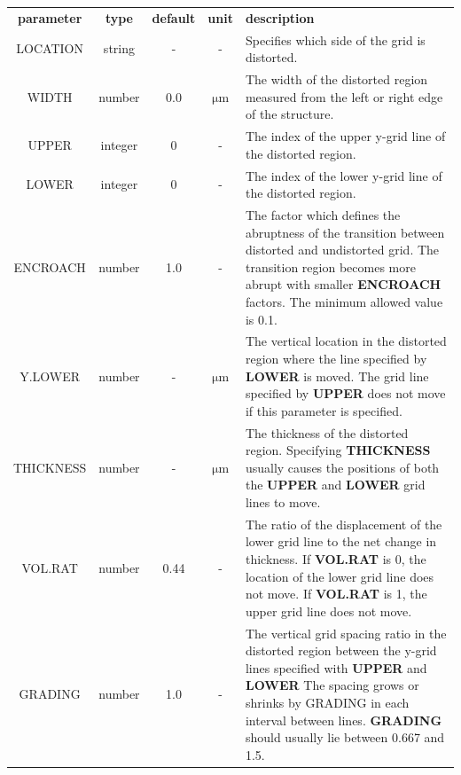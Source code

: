 \documentclass[11pt,pdftex]{article}
\begin{document}
\small
\noindent\begin{longtable}{ccccp{7cm}}
\textbf{parameter}   & \textbf{type}  & \textbf{default} & \textbf{unit} & \textbf{description} \\
LOCATION    & string  & -       & -                    & Specifies which side of the grid is distorted. \\
WIDTH       & number  & 0.0     & $\mathrm{\mu m}$     & The width of the distorted region measured from the left or
                                                         right edge of the structure. \\
UPPER       & integer & 0       & -                    & The index of the upper y-grid line of the distorted region. \\
LOWER       & integer & 0       & -                    & The index of the lower y-grid line of the distorted region. \\
ENCROACH    & number  & 1.0     & -                    & The factor which defines the abruptness of the transition
                                                         between distorted and undistorted grid. The transition region
                                                         becomes more abrupt with smaller \textbf{ENCROACH} factors. The minimum
                                                         allowed value is 0.1. \\
Y.LOWER     & number & -        & $\mathrm{\mu m}$     & The vertical location in the distorted region where the line
                                                         specified by \textbf{LOWER} is moved. The grid line specified by
                                                         \textbf{UPPER} does not move if this parameter is specified. \\
THICKNESS   & number & -        & $\mathrm{\mu m}$     & The thickness of the distorted region. Specifying \textbf{THICKNESS}
                                                         usually causes the positions of both the \textbf{UPPER} and \textbf{LOWER}
                                                         grid lines to move. \\
VOL.RAT     & number & 0.44     & -                    & The ratio of the displacement of the lower grid line to the net
                                                         change in thickness. If \textbf{VOL.RAT} is 0, the location of the
                                                         lower grid line does not move. If \textbf{VOL.RAT} is 1, the upper
                                                         grid line does not move. \\
GRADING     & number  & 1.0      & -                   & The vertical grid spacing ratio in the distorted region between
                                                         the y-grid lines specified with \textbf{UPPER} and \textbf{LOWER}
                                                         The spacing grows or shrinks by
                                                         GRADING in each interval between lines. \textbf{GRADING} should
                                                         usually lie between 0.667 and 1.5.
\end{longtable}
\normalsize
\end{document}
